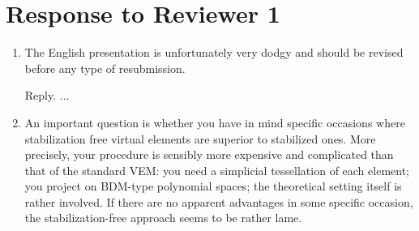 \documentclass[10pt]{amsart}
\theoremstyle{definition}
\theoremstyle{remark}
\begin{document}
\section{Response to Reviewer 1}
\begin{enumerate}[1.]

\item \textsf{The English presentation is unfortunately very dodgy and should be revised before any type of resubmission.}

\smallskip \noindent \textcolor[rgb]{1.00,0.00,0.00}{Reply.}
...


\medskip

\item \textsf{An important question is whether you have in mind specific occasions where stabilization free virtual elements are superior to stabilized ones. More precisely, your procedure is sensibly more expensive and complicated than that of the standard VEM: you need a simplicial tessellation of each element; you project on BDM-type polynomial spaces; the theoretical setting itself is rather involved. If there are no apparent advantages in some specific occasion, the stabilization-free approach seems to be rather lame.}


\end{enumerate}
\end{document}
